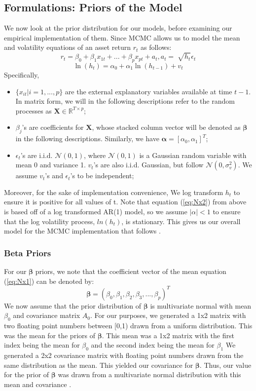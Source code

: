 \documentclass[letterpaper]{article}
\newcommand{\XX}{\mathbf{X}}
\begin{document}
	\subsection{Formulations: Priors of the Model}
	We now look at the prior distribution for our models, before examining our empirical implementation of them. Since MCMC allows us to model the mean and volatility equations of an asset return $r_t$ as follows:
	\begin{equation}
	r_{t} = \beta_{0} + \beta_{1} x_{1t} + ... + \beta_{p} x_{pt} + a_{t},
	a_{t} = \sqrt[]{h_t}\epsilon_{t}
	\label{eq:Nx1}
	\end{equation}
	\begin{equation}
	\ln(h_{t}) = \alpha_{0} + \alpha_{1}\ln(h_{t-1}) + v_t
	\label{eq:Nx2}
	\end{equation}
	Specifically,
	\begin{itemize}
		\item $\{x_{it} | i=1,...,p\}$ are the external explanatory variables available at time $t - 1$. In matrix form, we will in the following descriptions refer to the random processes as $\XX\in\mathbb{R}^{T\times p}$;
		\item $\beta_{j}$'s are coefficients for $\XX$, whose stacked column vector will be denoted as $\bm{\beta}$ in the following descriptions. Similarly, we have $\bm{\alpha}=[\alpha_0,\alpha_1]^T$;
		\item $\epsilon_{t}$'s are i.i.d. $\mathcal{N}(0,1)$, where $\mathcal{N}(0,1)$ is a Gaussian random variable with mean 0 and variance 1. $v_{t}$'s are also i.i.d. Gaussian, but follow $\mathcal{N}(0,\sigma^2_v)$. We assume $v_t$'s and $\epsilon_{t}$'s to be independent;
	\end{itemize}
	Moreover, for the sake of implementation convenience, We log transform $h_t$ to ensure it is positive for all values of t. Note that equation (\ref{eq:Nx2}) from above is based off of a log transformed AR(1) model, so we assume $|\alpha| < 1$ to ensure that the log volatility process, $ln(h_t)$, is stationary. This gives us our overall model for the MCMC implementation that follows \cite{tsay2002}.
	\subsubsection{Beta Priors}
	For our $\bm{\beta}$ priors, we note that the coefficient vector of the mean equation (\ref{eq:Nx1})  can be denoted by:
	$$ \bm{\beta} = (\beta_{0}, \beta_{1}, \beta_{2}, \beta_{3}, ..., \beta_{p})^T $$
	We now assume that the prior distribution of $\bm{\beta}$ is multivariate normal with mean $\beta_{0}$ and covariance matrix $A_{0}$. For our purposes, we generated a 1x2 matrix with two floating point numbers between [0,1) drawn from a uniform distribution. This was the mean for the priors of $\bm{\beta}$. This mean was a 1x2 matrix with the first index being the mean for $\beta_{0}$ and the second index being the mean for $\beta_{1}$ We generated a 2x2 covariance matrix with floating point numbers drawn from the same distribution as the mean. This yielded our covariance for $\bm{\beta}$. Thus, our value for the prior of $\bm{\beta}$ was drawn from a multivariate normal distribution with this mean and covariance \cite{tsay2002}.
\end{document}
